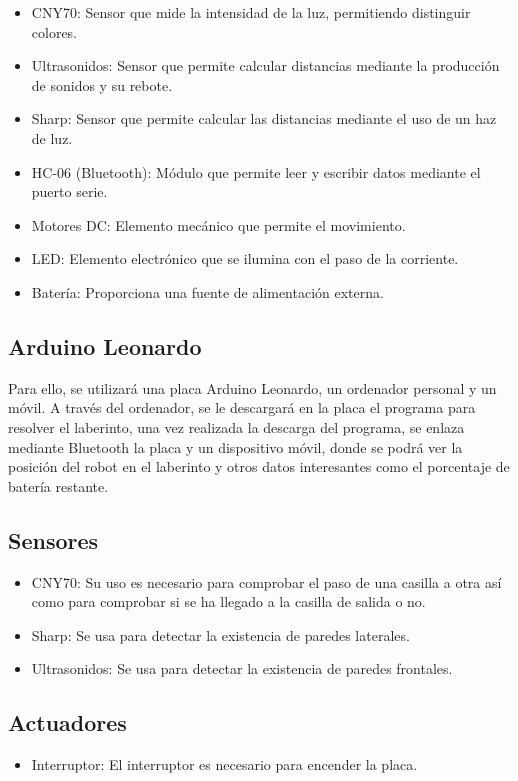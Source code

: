 \begin{itemize}
  \item CNY70: Sensor que mide la intensidad de la luz, permitiendo distinguir colores.
  \item Ultrasonidos: Sensor que permite calcular distancias mediante la producción de sonidos y su rebote.
  \item Sharp: Sensor que permite calcular las distancias mediante el uso de un haz de luz.
  \item HC-06 (Bluetooth): Módulo que permite leer y escribir datos mediante el puerto serie.
  \item Motores DC: Elemento mecánico que permite el movimiento.
  \item LED: Elemento electrónico que se ilumina con el paso de la corriente.
  \item Batería: Proporciona una fuente de alimentación externa.
\end{itemize}

\subsection{Arduino Leonardo}

Para ello, se utilizará una placa Arduino Leonardo, un ordenador personal y un móvil. A través del ordenador, se le descargará en la placa el programa para resolver el laberinto, una vez realizada la descarga del programa, se enlaza mediante Bluetooth la placa y un dispositivo móvil, donde se podrá ver la posición del robot en el laberinto y otros datos interesantes como el porcentaje de batería restante.

\subsection{Sensores}
\begin{itemize}
  \item CNY70: Su uso es necesario para comprobar el paso de una casilla a otra así como para comprobar si se ha llegado a la casilla de salida o no.
  \item Sharp: Se usa para detectar la existencia de paredes laterales.
  \item Ultrasonidos: Se usa para detectar la existencia de paredes frontales.
\end{itemize}

\subsection{Actuadores}
\begin{itemize}
  \item Interruptor: El interruptor es necesario para encender la placa.
\end{itemize}

